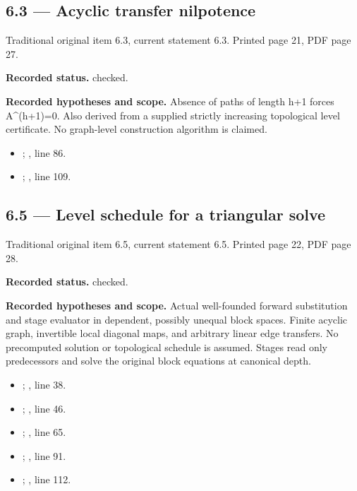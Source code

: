 \subsection{6.3 — Acyclic transfer nilpotence}
\label{result:6.3}
{\footnotesize\color{muted}Traditional original item 6.3, current statement 6.3. Printed page 21, PDF page 27.}\par
\textbf{Recorded status.} checked.

\textbf{Recorded hypotheses and scope.} Absence of paths of length h+1 forces A\textasciicircum{}(h+1)=0. Also derived from a supplied strictly increasing topological level certificate. No graph-level construction algorithm is claimed.

\begin{itemize}
\item {}; , line 86.
\item {}; , line 109.
\end{itemize}
\subsection{6.5 — Level schedule for a triangular solve}
\label{result:6.5}
{\footnotesize\color{muted}Traditional original item 6.5, current statement 6.5. Printed page 22, PDF page 28.}\par
\textbf{Recorded status.} checked.

\textbf{Recorded hypotheses and scope.} Actual well-founded forward substitution and stage evaluator in dependent, possibly unequal block spaces. Finite acyclic graph, invertible local diagonal maps, and arbitrary linear edge transfers. No precomputed solution or topological schedule is assumed. Stages read only predecessors and solve the original block equations at canonical depth.

\begin{itemize}
\item {}; , line 38.
\item {}; , line 46.
\item {}; , line 65.
\item {}; , line 91.
\item {}; , line 112.
\end{itemize}
